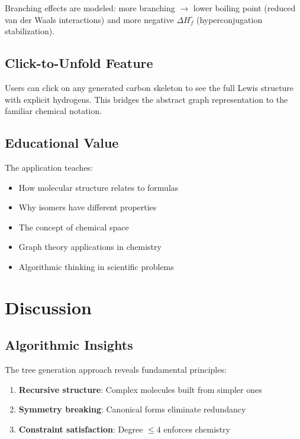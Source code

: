 \documentclass[conference]{IEEEtran}
\begin{document}
Branching effects are modeled: more branching $\to$ lower boiling point (reduced van der Waals interactions) and more negative $\Delta H_f^\circ$ (hyperconjugation stabilization).

\subsection{Click-to-Unfold Feature}

Users can click on any generated carbon skeleton to see the full Lewis structure with explicit hydrogens. This bridges the abstract graph representation to the familiar chemical notation.

\subsection{Educational Value}

The application teaches:
\begin{itemize}
    \item How molecular structure relates to formulas
    \item Why isomers have different properties
    \item The concept of chemical space
    \item Graph theory applications in chemistry
    \item Algorithmic thinking in scientific problems
\end{itemize}

\section{Discussion}

\subsection{Algorithmic Insights}

The tree generation approach reveals fundamental principles:

\begin{enumerate}
    \item \textbf{Recursive structure}: Complex molecules built from simpler ones
    \item \textbf{Symmetry breaking}: Canonical forms eliminate redundancy
    \item \textbf{Constraint satisfaction}: Degree $\leq 4$ enforces chemistry
\end{enumerate}
\end{document}
